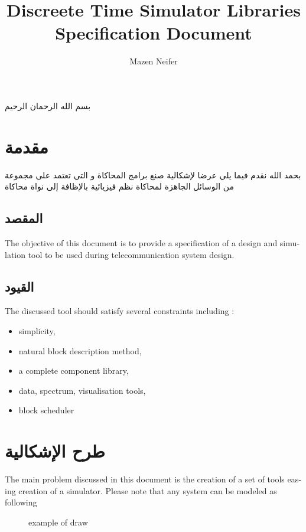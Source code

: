 \documentclass[10pt, a4paper]{article}
\begin{document}
\title{{\bf D}iscreete {\bf T}ime {\bf S}imulator {\bf L}ibraries\\Specification Document}
\author{Mazen Neifer}
\maketitle
\newpage
{}
\begin{center}
{\huge بسم الله الرحمان الرحيم}
\end{center}
\section{مقدمة}
بحمد الله نقدم فيما يلي عرضا لإشكالية صنع برامج المحاكاة  و التي تعتمد على مجموعة من الوسائل الجاهزة لمحاكاة نظم فيزيائية بالإظافة إلى نواة محاكاة
\subsection{المقصد}
\begin{otherlanguage}{english}
The objective of this document is to provide a specification of a design and simulation tool to be used during telecommunication system design.
\end{otherlanguage}
\subsection{القيود}
\begin{otherlanguage}{english}
The discussed tool should satisfy several constraints including :
\begin{itemize}
\item simplicity,
\item natural block description method,
\item a complete component library,
\item data, spectrum, visualisation tools,
\item block scheduler
\end{itemize}
\end{otherlanguage}
\section{طرح الإشكالية}
\begin{otherlanguage}{english}
The main problem discussed in this document is the creation of a set of tools easing creation of a simulator. Please note that any system can be modeled as following
\begin{figure}[h]
\begin{texdraw}
\end{texdraw}
\caption{example of draw}
\end{figure}
\end{otherlanguage}
\end{document}
